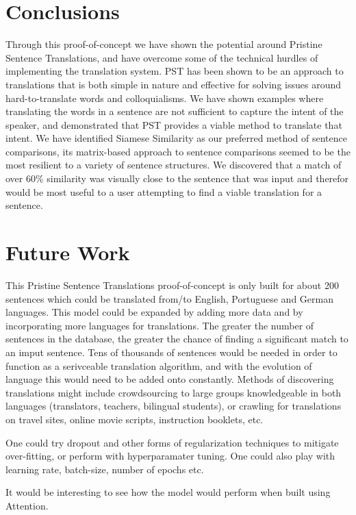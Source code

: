 \documentclass[runningheads]{llncs}
\begin{document}
	
	\section{Conclusions}
	Through this proof-of-concept we have shown the potential around Pristine Sentence Translations, and have overcome some of the technical hurdles of implementing the translation system. PST has been shown to be an approach to translations that is both simple in nature and effective for solving issues around hard-to-translate words and colloquialisms. We have shown examples where translating the words in a sentence are not sufficient to capture the intent of the speaker, and demonstrated that PST provides a viable method to translate that intent. 
	We have identified Siamese Similarity as our preferred method of sentence comparisons, its matrix-based approach to sentence comparisons seemed to be the most resilient to a variety of sentence structures. We discovered that a match of over 60\% similarity was visually close to the sentence that was input and therefor would be most useful to a user attempting to find a viable translation for a sentence.

	\section{Future Work}
	This Pristine Sentence Translations proof-of-concept is only built for about 200 sentences which could be translated from/to English, Portuguese and German languages. This model could be expanded by adding more data and by incorporating more languages for translations. The greater the number of sentences in the database, the greater the chance of finding a significant match to an imput sentence. Tens of thousands of sentences would be needed in order to function as a serivceable translation algorithm, and with the evolution of language this would need to be added onto constantly. Methods of discovering translations might include crowdsourcing to large groups knowledgeable in both languages (translators, teachers, bilingual students), or crawling for translations on travel sites, online movie scripts, instruction booklets, etc.
	
	One could try dropout and other forms of regularization techniques to mitigate over-fitting, or perform with hyperparamater tuning. One could also play with learning rate, batch-size, number of epochs etc.
	
	It would be interesting to see how the model would perform when built using Attention.
	
\end{document}
